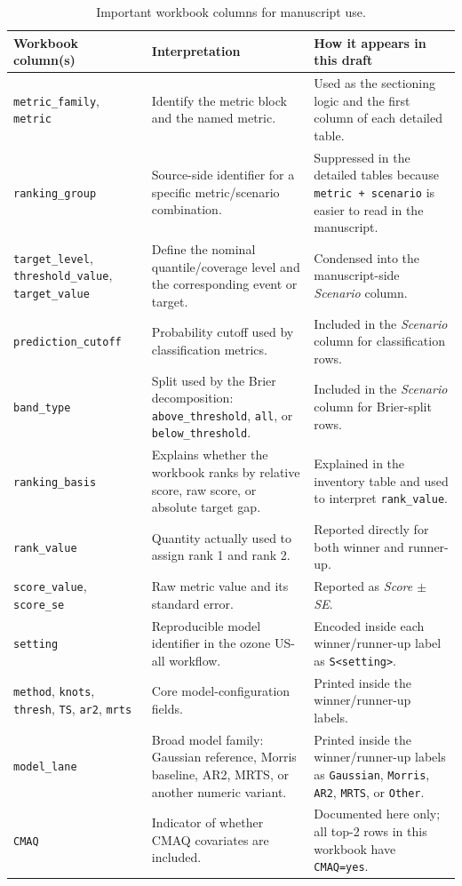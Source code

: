 \documentclass[11pt]{article}
\begin{document}
\begin{table}[htbp]
\centering
\small
\begin{tabularx}{\linewidth}{@{}P{3.5cm}Y Y@{}}
\toprule
Workbook column(s) & Interpretation & How it appears in this draft \\
\midrule
\texttt{metric\_family}, \texttt{metric} & Identify the metric block and the
named metric. & Used as the sectioning logic and the first column of each
detailed table. \\
\texttt{ranking\_group} & Source-side identifier for a specific metric/scenario
combination. & Suppressed in the detailed tables because \texttt{metric +
scenario} is easier to read in the manuscript. \\
\texttt{target\_level}, \texttt{threshold\_value}, \texttt{target\_value} &
Define the nominal quantile/coverage level and the corresponding event or
target. & Condensed into the manuscript-side \emph{Scenario} column. \\
\texttt{prediction\_cutoff} & Probability cutoff used by classification
metrics. & Included in the \emph{Scenario} column for classification rows. \\
\texttt{band\_type} & Split used by the Brier decomposition:
\texttt{above\_threshold}, \texttt{all}, or \texttt{below\_threshold}. &
Included in the \emph{Scenario} column for Brier-split rows. \\
\texttt{ranking\_basis} & Explains whether the workbook ranks by relative score,
raw score, or absolute target gap. & Explained in the inventory table and used
to interpret \texttt{rank\_value}. \\
\texttt{rank\_value} & Quantity actually used to assign rank 1 and rank 2. &
Reported directly for both winner and runner-up. \\
\texttt{score\_value}, \texttt{score\_se} & Raw metric value and its standard
error. & Reported as \emph{Score $\pm$ SE}. \\
\texttt{setting} & Reproducible model identifier in the ozone US-all workflow.
& Encoded inside each winner/runner-up label as \texttt{S<setting>}. \\
\texttt{method}, \texttt{knots}, \texttt{thresh}, \texttt{TS},
\texttt{ar2}, \texttt{mrts} & Core model-configuration fields. &
Printed inside the winner/runner-up labels. \\
\texttt{model\_lane} & Broad model family: Gaussian reference, Morris
baseline, AR2, MRTS, or another numeric variant. & Printed inside the
winner/runner-up labels as \texttt{Gaussian}, \texttt{Morris},
\texttt{AR2}, \texttt{MRTS}, or \texttt{Other}. \\
\texttt{CMAQ} & Indicator of whether CMAQ covariates are included. &
Documented here only; all top-2 rows in this workbook have \texttt{CMAQ=yes}. \\
\bottomrule
\end{tabularx}
\caption{Important workbook columns for manuscript use.}
\end{table}
\end{document}
